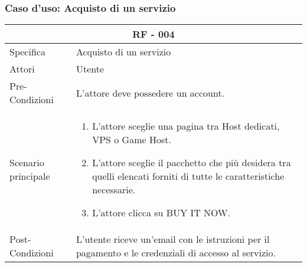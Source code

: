 \documentclass{article}
\begin{document}
	\subsubsection{\textbf{Caso d'uso: Acquisto di un servizio}}
\begin{tabular}{ |p{3cm}|p{8cm}|  }
	\hline
	\multicolumn{2}{|c|}{\textbf{RF - 004}} \\
	\hline
	Specifica& Acquisto di un servizio\\
	\hline
	Attori& Utente\\
	\hline
	Pre-Condizioni& L'attore deve possedere un account.\\
	\hline
	Scenario principale& \begin{enumerate}
		\item L'attore sceglie una pagina tra Host dedicati, VPS o Game Host.
		\item L'attore sceglie il pacchetto che più desidera tra quelli elencati forniti di tutte le caratteristiche necessarie.
		\item L'attore clicca su BUY IT NOW.
	\end{enumerate}\\
	\hline
	Post-Condizioni& L'utente riceve un'email con le istruzioni per il pagamento e le credenziali di accesso al servizio.\\
	\hline
\end{tabular}
	\normalsize
\flushleft
\vspace{4mm} 
\end{document}
